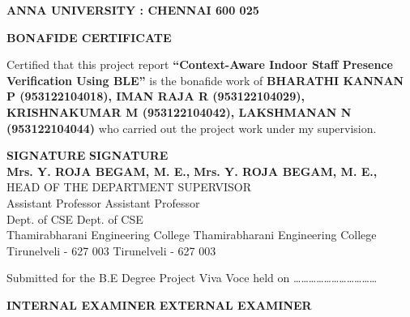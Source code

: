 \centering
{\Large \textbf{ANNA UNIVERSITY : CHENNAI 600 025} \par}
\vspace{1.5cm}
{\Large \textbf{BONAFIDE CERTIFICATE} \par}
\vspace{1.5cm}
\doublespacing %
\normalsize
Certified that this project report \textbf{“Context-Aware Indoor Staff Presence Verification Using BLE”} is the bonafide work of \textbf{BHARATHI KANNAN P (953122104018), IMAN RAJA R (953122104029), KRISHNAKUMAR M (953122104042), LAKSHMANAN N (953122104044)} who carried out the project work under my supervision.

\vspace{3cm}
\onehalfspacing
\noindent \textbf{SIGNATURE} \hfill \textbf{SIGNATURE} \\
\noindent \textbf{Mrs. Y. ROJA BEGAM, M. E.,} \hfill \textbf{Mrs. Y. ROJA BEGAM, M. E.,} \\
\noindent HEAD OF THE DEPARTMENT \hfill SUPERVISOR \\
\noindent Assistant Professor \hfill Assistant Professor \\
\noindent Dept. of CSE \hfill Dept. of CSE \\
\noindent Thamirabharani Engineering College \hfill Thamirabharani Engineering College \\
\noindent Tirunelveli - 627 003 \hfill Tirunelveli - 627 003

\vspace{2cm}
\doublespacing
\noindent Submitted for the B.E Degree Project Viva Voce held on \dots\dots\dots\dots\dots\dots\dots\dots\dots\dots\dots

\vspace{2cm}
\noindent \textbf{INTERNAL EXAMINER} \hfill \textbf{EXTERNAL EXAMINER}
